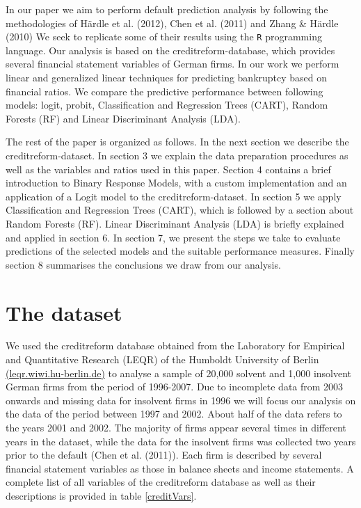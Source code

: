 \documentclass{article}
\begin{document}
In our paper we aim to perform default prediction analysis by following the methodologies of H{\"a}rdle et al. (2012), Chen et al. (2011) and Zhang \& H{\"a}rdle (2010) We seek to replicate some of their results using the \texttt{R} programming language. Our analysis is based on the creditreform-database, which provides several 
financial statement variables of German firms. In our work we perform linear and generalized linear techniques for predicting bankruptcy based on financial ratios. We compare the predictive performance between following models: logit, probit, Classification and Regression Trees (CART), Random Forests (RF) and Linear Discriminant Analysis (LDA). 

The rest of the paper is organized as follows. In the next section we describe the creditreform-dataset. In section 3 we explain the data preparation procedures as well as the variables and ratios used in this paper. Section 4 contains a brief introduction to Binary Response Models, with a custom implementation and an application of a Logit model to the creditreform-dataset. In section 5 we apply Classification and Regression Trees (CART), which is followed by a section about Random Forests (RF). Linear Discriminant Analysis (LDA) is briefly explained and applied in section 6. In section 7, we present the steps we take to evaluate predictions of the selected models and the suitable performance measures. Finally section 8 summarises the conclusions we draw from our analysis.

\section{The dataset}

We used the creditreform database obtained from the Laboratory for Empirical and Quantitative Research (LEQR) of the Humboldt University of Berlin \href{https://leqr.wiwi.hu-berlin.de/leqr/content/databaseInformation/creditreform/creditreform.htm}{(leqr.wiwi.hu-berlin.de)} to analyse a sample of 20,000 solvent and 1,000 insolvent German firms from the period of 1996-2007. Due to incomplete data from 2003 onwards and missing data for insolvent firms in 1996 we will focus our analysis on the data of the period between 1997 and 2002. About half of the data refers to the years 2001 and 2002. The majority of firms appear several times in different years in the dataset, while the data for the insolvent firms was collected two years prior to the default (Chen et al. (2011)). Each firm is described by several financial statement variables as those in balance sheets and income statements. A complete list of all variables of the creditreform database as well as their descriptions is provided in table \ref{creditVars}. 
\end{document}
